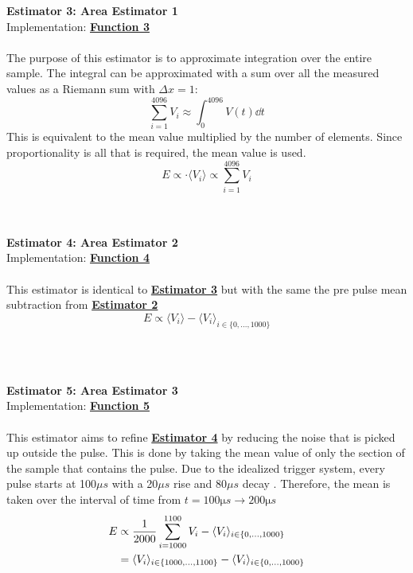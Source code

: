 \documentclass[
	letterpaper, %
	10pt, %
]{template}
\begin{document}
\begin{minipage}[t]{.45\textwidth}
{\large\textbf{Estimator 3: Area Estimator 1}~\label{est-3}}\\
Implementation: \textbf{\hyperref[lst-3]{Function 3}}\\\\
The purpose of this estimator is to approximate integration over the entire sample. The integral can be approximated with a sum over all the measured values as a Riemann sum with $\Delta x = 1$:
\[ \sum_{i=1}^{4096} V_i \approx\int_0^{4096}V(t)\dd{t} \]
This is equivalent to the mean value multiplied by the number of elements. Since proportionality is all that is required, the mean value is used.
\[ E \propto \cdot \langle V_i\rangle \propto \sum_{i=1}^{4096} V_i \]\\\\
\end{minipage}
\hfill
\begin{minipage}[t]{.45\textwidth}
{\large\textbf{Estimator 4: Area Estimator 2}~\label{est-4}}\\
Implementation: \textbf{\hyperref[lst-4]{Function 4}}\\\\
This estimator is identical to \textbf{\hyperref[est-3]{Estimator 3}} but with the same the pre pulse mean subtraction from \textbf{\hyperref[est-2]{Estimator 2}}
\[ E \propto \langle V_i\rangle - \langle V_i \rangle_{i\in\{0,...,1000\}}\]
\end{minipage}\\\\
\begin{minipage}[t]{.45\textwidth}
{\large\textbf{Estimator 5: Area Estimator 3}~\label{est-5}}\\
Implementation: \textbf{\hyperref[lst-5]{Function 5}}\\\\
This estimator aims to refine \textbf{\hyperref[est-4]{Estimator 4}} by reducing the noise that is picked up outside the pulse. This is done by taking the mean value of only the section of the sample that contains the pulse. Due to the idealized trigger system, every pulse starts at 100$\mu s$ with a 20$\mu s$ rise and 80$\mu s$ decay \cite{labManual} . Therefore, the mean is taken over the interval of time from $t=100\unit{\micro s} \rightarrow 200\unit{\micro s}$
\begin{align*}
	E &\propto {1 \over 2000} \sum_{i=1000}^{1100} V_i - \langle V_i \rangle_{i\in\{0,...,1000\}}\\
	&= \langle V_i\rangle _{i\in\{1000, ... ,1100\}} - \langle V_i \rangle_{i\in\{0,...,1000\}}
\end{align*}
\end{minipage}
\end{document}
